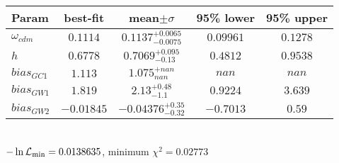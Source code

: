 \begin{tabular}{|l|c|c|c|c|} 
 \hline 
Param & best-fit & mean$\pm\sigma$ & 95\% lower & 95\% upper \\ \hline 
$\omega_{cdm }$ &$0.1114$ & $0.1137_{-0.0075}^{+0.0065}$ & $0.09961$ & $0.1278$ \\ 
$h$ &$0.6778$ & $0.7069_{-0.13}^{+0.095}$ & $0.4812$ & $0.9538$ \\ 
$bias_{GC 1 }$ &$1.113$ & $1.075_{nan}^{+nan}$ & $nan$ & $nan$ \\ 
$bias_{GW 1 }$ &$1.819$ & $2.13_{-1.1}^{+0.48}$ & $0.9224$ & $3.639$ \\ 
$bias_{GW 2 }$ &$-0.01845$ & $-0.04376_{-0.32}^{+0.35}$ & $-0.7013$ & $0.59$ \\ 
\hline 
 \end{tabular} \\ 
$-\ln{\cal L}_\mathrm{min} =0.0138635$, minimum $\chi^2=0.02773$ \\ 
